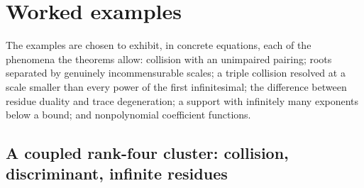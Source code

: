 \documentclass[11pt,letterpaper]{article}
\theoremstyle{definition}
\theoremstyle{remark}
\numberwithin{equation}{section}
\begin{document}
\section{Worked examples}
\label{finite:sec:examples}

The examples are chosen to exhibit, in concrete equations, each of the phenomena the theorems allow: collision with an unimpaired pairing; roots separated by genuinely incommensurable scales; a triple collision resolved at a scale smaller than every power of the first infinitesimal; the difference between residue duality and trace degeneration; a support with infinitely many exponents below a bound; and nonpolynomial coefficient functions.

\subsection{A coupled rank-four cluster: collision, discriminant, infinite residues}
\label{finite:sec:collision}
\end{document}
